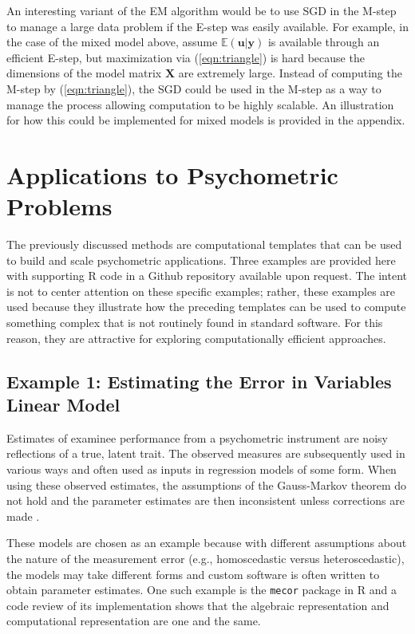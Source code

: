 \documentclass[12pt]{article}
\begin{document}
An interesting variant of the EM algorithm would be to use SGD in the M-step to manage a large data problem if the E-step was easily available. For example, in the case of the mixed model above, assume $\mathbb{E}(\bm{u}|\bm{y})$ is available through an efficient E-step, but maximization via (\ref{eqn:triangle}) is hard because the dimensions of the model matrix $\bm{X}$ are extremely large. Instead of computing the M-step by (\ref{eqn:triangle}), the SGD could be used in the M-step as a way to manage the process allowing computation to be highly scalable. An illustration for how this could be implemented  for mixed models is provided in the appendix. 

\section*{Applications to Psychometric Problems}

The previously discussed methods are computational templates that can be used to build and scale psychometric applications. Three examples are provided here with supporting R code in a Github repository available upon request. The intent is not to center attention on these specific examples; rather, these examples are used because they illustrate how the preceding templates can be used to compute something complex that is not routinely found in standard software. For this reason, they are attractive for exploring computationally efficient approaches. 

\subsection*{Example 1: Estimating the Error in Variables Linear Model}

Estimates of examinee performance from a psychometric instrument are noisy reflections of a true, latent trait. The observed measures are subsequently used in various ways and often used as inputs in regression models of some form. When using these observed estimates, the assumptions of the Gauss-Markov theorem do not hold and the parameter estimates are then inconsistent unless corrections are made \cite{doran:eiv,lockwood:eiv,nab}.   

These models are chosen as an example because with different assumptions about the nature of the measurement error (e.g., homoscedastic versus heteroscedastic), the models may take different forms and custom software is often written to obtain parameter estimates. One such example is the \texttt{mecor} \cite{nab} package in R and a code review of its implementation shows that the algebraic representation and computational representation are one and the same. 
\end{document}
